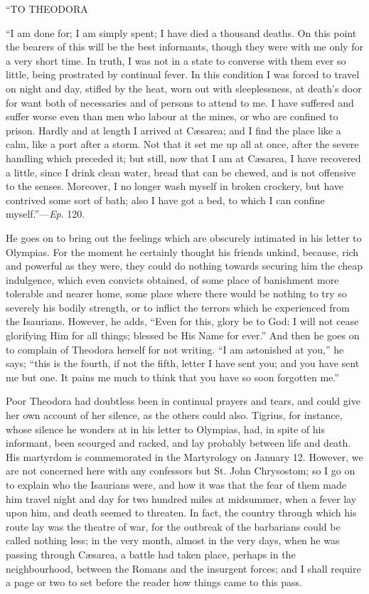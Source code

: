 ``TO
THEODORA

``I am done for; I am simply spent; I have died a thousand
deaths. On this point the bearers of this will be the best informants,
though they were with me only for a very short time. In truth, I was
not in a state to converse with them ever so little, being prostrated
by continual fever. In this condition I was forced to travel on night
and day, stifled by the heat, worn out with sleeplessness, at death's
door for want both of necessaries and of persons to attend to me. I
have suffered and suffer worse even than men who labour at the mines,
or who are confined to prison. Hardly and at length I arrived at
Cæsarea; and I find the place like a calm, like a port after a storm.
Not that it set me up all at once, after the severe handling which
preceded it; but still, now that I am at Cæsarea, I have recovered a
little, since I drink clean water, bread that can be chewed, and is
not offensive to the senses. Moreover, I no longer wash myself in
broken crockery, but have contrived some sort of bath; also I have got
a bed, to which I can confine myself.''—\emph{Ep}. 120.

He goes on to bring out the feelings which are obscurely intimated
in his letter to Olympias. For the moment he certainly thought his
friends unkind, because, rich and powerful as they were, they could do
nothing towards securing him the cheap indulgence, which even convicts
obtained, of some place of banishment more tolerable and nearer home,
some place where there would be nothing to try so severely his bodily
strength, or to inflict the terrors which he experienced from the
Isaurians. However, he adds, ``Even for this, glory be to God: I
will not cease glorifying Him for all things; blessed be His Name for
ever.'' And then he goes on to complain of Theodora herself for
not writing. ``I am astonished at you,'' he says; ``this
is the fourth, if not the fifth, letter I have sent you; and you have
sent me but one. It pains me much to think that you have so soon
forgotten me.''

Poor Theodora had doubtless been in continual prayers and tears,
and could give her own account of her silence, as the others could
also. Tigrius, for instance, whose silence he wonders at in his letter
to Olympias, had, in spite of his informant, been scourged and racked,
and lay probably between life and death. His martyrdom is commemorated
in the Martyrology on January 12. However, we are not concerned here
with any confessors but St. John Chrysostom; so I go on to explain who
the Isaurians were, and how it was that the fear of them made him
travel night and day for two hundred miles at midsummer, when a fever
lay upon him, and death seemed to threaten. In fact, the country
through which his route lay was the theatre of war, for the outbreak
of the barbarians could be called nothing less; in the very month,
almost in the very days, when he was passing through Cæsarea, a
battle had taken place, perhaps in the neighbourhood, between the
Romans and the insurgent forces; and I shall require a page or two to
set before the reader how things came to this pass.

